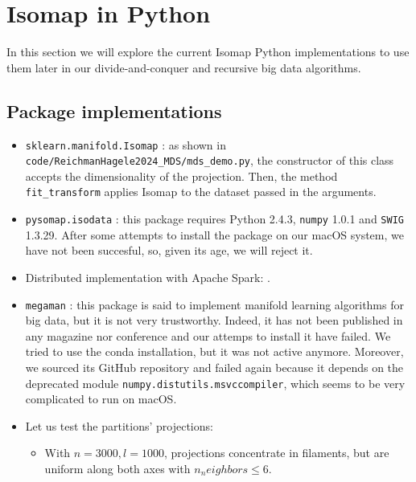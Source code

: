 \documentclass[a4paper,12pt]{article}
\begin{document}
\pagebreak
\section{Isomap in Python}

In this section we will explore the current Isomap Python implementations to use them later in our divide-and-conquer and recursive big data algorithms.

\subsection{Package implementations}

\begin{itemize}
    \item \texttt{sklearn.manifold.Isomap} \cite{pedregosa2011scikit}: as shown in  \nolinkurl{code/ReichmanHagele2024_MDS/mds_demo.py}, the constructor of this class accepts the dimensionality of the projection.  Then, the method \nolinkurl{fit_transform} applies Isomap to the dataset passed in the arguments.

    \item \texttt{pysomap.isodata} \cite{spiwokv2007}: this package requires Python 2.4.3, \texttt{numpy} 1.0.1 and \texttt{SWIG} 1.3.29. After some attempts to install the package on our macOS system, we have not been succesful, so, given its age, we will reject it.

    \item Distributed implementation with Apache Spark: \cite{Isomap_ApacheSpark}.

    \item \texttt{megaman} \cite{mcqueen2016megamanmanifoldlearningmillions}: this package is said to implement manifold learning algorithms for big data, but it is not very trustworthy. Indeed, it has not been published in any magazine nor conference and our attemps to install it have failed. We tried to use the conda installation, but it was not active anymore. Moreover, we sourced its GitHub repository and failed again because it depends on the deprecated module \texttt{numpy.distutils.msvccompiler}, which seems to be very complicated to run on macOS.
    \item Let us test the partitions' projections:
    \begin{itemize}
        \item With $n=3000, l=1000$, projections concentrate in filaments, but are uniform along both axes with $n_neighbors \leq 6$. 
    \end{itemize}
\end{itemize}
\end{document}
